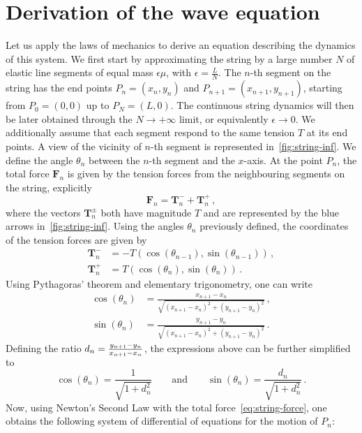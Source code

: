 \section{Derivation of the wave equation}
Let us apply the laws of mechanics to derive an equation describing the dynamics of this
system. We first start by approximating the string by a large number $N$ of elastic line
segments of equal mass $\epsilon\mu$, with $\epsilon=\frac{L}{N}$. The $n$-th segment on
the string has the end points $P_n=(x_n,y_n)$ and $P_{n+1}=(x_{n+1},y_{n+1})$, starting
from $P_0=(0,0)$ up to $P_N=(L,0)$. The continuous string dynamics will then be later
obtained through the $N\to+\infty$ limit, or equivalently $\epsilon\to 0$. We additionally
assume that each segment respond to the same tension $T$ at its end points. A view of the
vicinity of $n$-th segment is represented in~\cref{fig:string-inf}. We define the angle
$\theta_n$ between the $n$-th segment and the $x$-axis. At the point $P_n$, the total
force $\mathbf{F}_n$ is given by the tension forces from the neighbouring segments on the
string, explicitly
\begin{equation}
  \mathbf{F}_n=\mathbf{T}_n^-+\mathbf{T}_n^+\,,\label{eq:string-force}
\end{equation}
where the vectors $\mathbf{T}_n^\pm$ both have magnitude $T$ and are represented by the
blue arrows in~\cref{fig:string-inf}. Using the angles $\theta_n$ previously defined, the
coordinates of the tension forces are given by
\begin{align}
  \mathbf{T}_n^-&=-T(\cos(\theta_{n-1}),\sin(\theta_{n-1}))\,,\\
  \mathbf{T}_n^+&=T(\cos(\theta_{n}),\sin(\theta_{n}))\,.
\end{align}
Using Pythagoras' theorem and elementary trigonometry, one can write
\begin{align}
  \cos(\theta_n)&=\frac{x_{n+1}-x_n}{\sqrt{(x_{n+1}-x_n)^2+(y_{n+1}-y_n)^2}}\,,\\
  \sin(\theta_n)&=\frac{y_{n+1}-y_n}{\sqrt{(x_{n+1}-x_n)^2+(y_{n+1}-y_n)^2}}\,.
\end{align}
Defining the ratio $d_n=\smash{\frac{y_{n+1}-y_n}{x_{n+1}-x_n}}$, the expressions above
can be further simplified to
\begin{equation}
  \cos(\theta_n)=\frac{1}{\sqrt{1+d_n^2}}\qquad\text{and}\qquad
  \sin(\theta_n)=\frac{d_n}{\sqrt{1+d_n^2}}\,.
\end{equation}
Now, using Newton's Second Law with the total force~\cref{eq:string-force}, one obtains
the following system of differential of equations for the motion of $P_n$:
